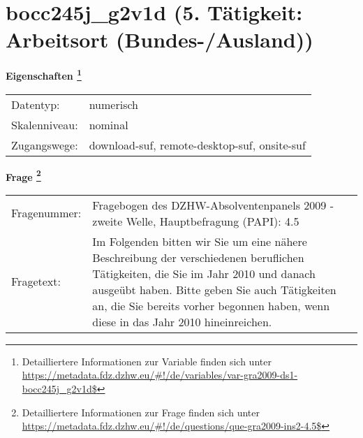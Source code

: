 
    \setcounter{footnote}{0}

    \vspace*{-1.8cm}
	\section{bocc245j\_g2v1d (5. Tätigkeit: Arbeitsort (Bundes-/Ausland))}
	\label{section:bocc245j_g2v1d}



    \vspace*{0.5cm}
    \noindent\textbf{Eigenschaften
	\footnote{Detailliertere Informationen zur Variable finden sich unter
		\url{https://metadata.fdz.dzhw.eu/\#!/de/variables/var-gra2009-ds1-bocc245j_g2v1d$}}}\\
	\begin{tabularx}{\hsize}{@{}lX}
	Datentyp: & numerisch \\
	Skalenniveau: & nominal \\
	Zugangswege: &
	  download-suf, 
	  remote-desktop-suf, 
	  onsite-suf
 \\
    \end{tabularx}



				\vspace*{0.5cm}
                \noindent\textbf{Frage
	                \footnote{Detailliertere Informationen zur Frage finden sich unter
		              \url{https://metadata.fdz.dzhw.eu/\#!/de/questions/que-gra2009-ins2-4.5$}}}\\
				\begin{tabularx}{\hsize}{@{}lX}
					Fragenummer: &
					  Fragebogen des DZHW-Absolventenpanels 2009 - zweite Welle, Hauptbefragung (PAPI):
					  4.5
 \\
					Fragetext: & Im Folgenden bitten wir Sie um eine nähere Beschreibung der verschiedenen beruflichen Tätigkeiten, die Sie im Jahr 2010 und danach ausgeübt haben. Bitte geben Sie auch Tätigkeiten an, die Sie bereits vorher begonnen haben, wenn diese in das Jahr 2010 hineinreichen. \\
				\end{tabularx}





